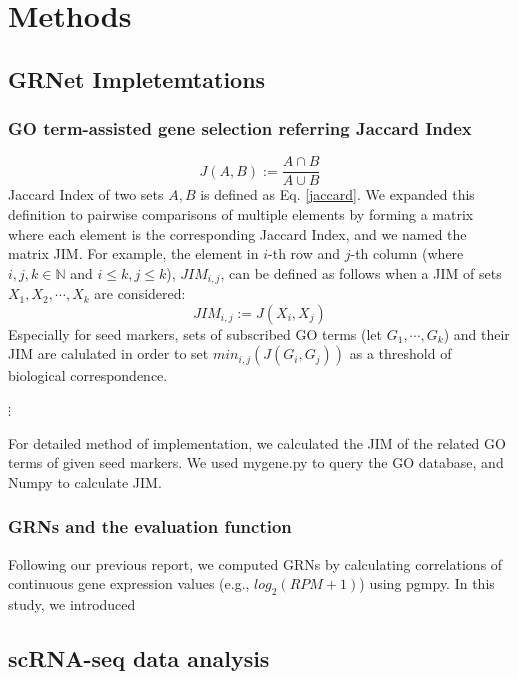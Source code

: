 \documentclass{article}
\begin{document}
\section*{Methods}
\subsection*{GRNet Impletemtations}

\subsubsection*{GO term-assisted gene selection referring Jaccard Index}
\begin{equation}\label{jaccard}
  J(A, B) := \frac{A\cap B}{A\cup B}
\end{equation}
Jaccard Index of two sets $A, B$ is defined as Eq. \eqref{jaccard}. We expanded this 
definition to pairwise comparisons of multiple elements by forming a matrix 
where each element is the corresponding Jaccard Index, and we named the matrix \ac{JIM}. For example, the element in 
$i$-th row and $j$-th column (where $i, j, k\in\mathbb{N}$ and $i\leq k, j\leq k$), $JIM_{i,j}$, can be defined as
follows when a JIM of sets $X_1, X_2,\cdots, X_k$ are considered:
\begin{equation}\label{jim}
  JIM_{i, j} := J(X_i, X_j)
\end{equation}
Especially for seed markers, sets of subscribed GO terms (let $G_1, \cdots, G_k$)
and their JIM are calulated in order to set $min_{i,j}(J(G_i, G_j))$ as a threshold of 
biological correspondence.

$\vdots$

For detailed method of implementation, we calculated the JIM of the related GO terms of given seed markers. We used mygene.py\cite{mygene} to query the GO database, and Numpy\cite{numpy} to calculate JIM.

\subsubsection*{GRNs and the evaluation function}
Following our previous report\cite{okano2023set}, we computed GRNs by calculating
correlations of continuous gene expression values (e.g., $log_2(RPM+1)$) using pgmpy. In this study, we introduced

\subsection*{scRNA-seq data analysis}
\end{document}

